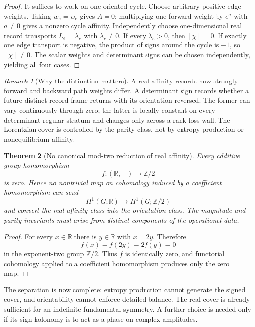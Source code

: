 \documentclass[11pt]{article}
\newtheorem{theorem}{Theorem}[section]
\theoremstyle{definition}
\theoremstyle{remark}
\newtheorem{remark}[theorem]{Remark}
\newcommand{\R}{\mathbb R}
\newcommand{\Ztwo}{\mathbb Z/2}
\begin{document}
\begin{proof}
It suffices to work on one oriented cycle.  Choose arbitrary positive edge
weights.  Taking $w_e=w_{\bar e}$ gives $A=0$; multiplying one forward weight
by $e^a$ with $a\ne0$ gives a nonzero cycle affinity.  Independently choose
one-dimensional real record transports $L_e=\lambda_e$ with $\lambda_e\ne0$.
If every $\lambda_e>0$, then $[\chi]=0$.  If exactly one edge transport is
negative, the product of signs around the cycle is $-1$, so $[\chi]\ne0$.
The scalar weights and determinant signs can be chosen independently, yielding
all four cases.
\end{proof}

\begin{remark}[Why the distinction matters]
A real affinity records how strongly forward and backward path weights differ.
A determinant sign records whether a future-distinct record frame returns with
its orientation reversed.  The former can vary continuously through zero; the
latter is locally constant on every determinant-regular stratum and changes
only across a rank-loss wall.  The Lorentzian cover is controlled by the
parity class, not by entropy production or nonequilibrium affinity.
\end{remark}

\begin{theorem}[No canonical mod-two reduction of real affinity]
\label{thm:no-affinity-parity-reduction}
Every additive group homomorphism
\[
 f:(\R,+)\longrightarrow\Ztwo
\]
is zero.  Hence no nontrivial map on cohomology induced by a coefficient
homomorphism can send
\[
 H^1(G;\R)\longrightarrow H^1(G;\Ztwo)
\]
and convert the real affinity class into the orientation class.  The magnitude
and parity invariants must arise from distinct components of the operational
data.
\end{theorem}

\begin{proof}
For every $x\in\R$ there is $y\in\R$ with $x=2y$.  Therefore
\[
 f(x)=f(2y)=2f(y)=0
\]
in the exponent-two group $\Ztwo$.  Thus $f$ is identically zero, and functorial
cohomology applied to a coefficient homomorphism produces only the zero map.
\end{proof}

The separation is now complete: entropy production cannot generate the signed
cover, and orientability cannot enforce detailed balance.  The real cover is
already sufficient for an indefinite fundamental symmetry.  A further choice is
needed only if its sign holonomy is to act as a phase on complex amplitudes.
\end{document}
